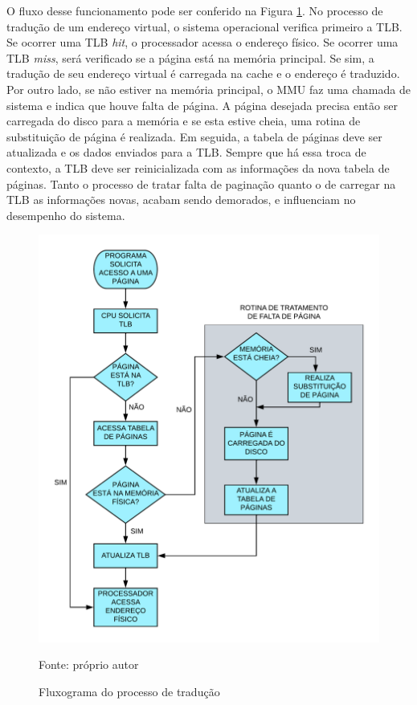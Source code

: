 O fluxo desse funcionamento pode ser conferido na Figura \ref{fig:fluxo}. No processo de tradução de um endereço virtual, o sistema operacional verifica
primeiro a TLB. Se ocorrer uma TLB \textit{hit}, o processador acessa o endereço físico. Se ocorrer uma TLB \textit{miss}, será verificado se a página está na memória principal. Se sim, a tradução de seu endereço virtual é carregada na cache e o endereço é traduzido. Por outro lado, se não estiver na memória principal, o MMU faz uma chamada de sistema e indica
que houve falta de página. A página desejada precisa então ser carregada do disco para a
memória e se esta estive cheia, uma rotina de substituição de página é realizada. Em seguida, a tabela de páginas deve ser atualizada e os dados enviados para a TLB. Sempre
que há essa troca de contexto, a TLB deve ser reinicializada com as informações da nova
tabela de páginas. 
Tanto o processo de tratar falta de paginação quanto o de carregar na TLB as
informações novas, acabam sendo demorados, e influenciam no desempenho do sistema.

\begin{figure}[ht]
\centering
\includegraphics[scale=0.8]{figuras/fluxogramatlb.png}
\caption{Fluxograma do processo de tradução}{Fonte: próprio autor}
\label{fig:fluxo}
\end{figure}

